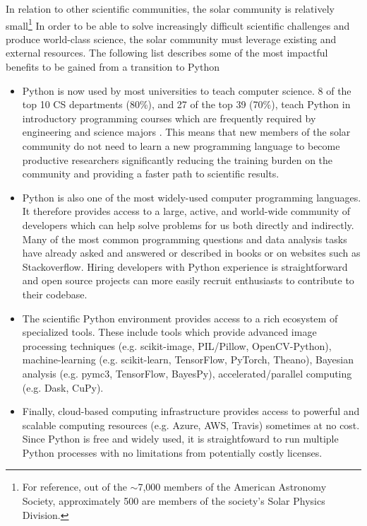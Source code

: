 In relation to other scientific communities, the solar community is relatively small\footnote{For reference, out of the $\sim$7,000 members of the American Astronomy Society, approximately 500 are members of the society's Solar Physics Division.}
In order to be able to solve increasingly difficult scientific challenges and produce world-class science, the solar community must leverage existing and external resources.
The following list describes some of the most impactful benefits to be gained from a transition to Python

\begin{itemize}
  \item Python is now used by most universities to teach computer science. 8 of the top 10 CS departments (80\%), and 27 of the top 39 (70\%), teach Python in introductory programming courses which are frequently required by engineering and science majors \citep{guo2014}. This means that new members of the solar community do not need to learn a new programming language to become productive researchers significantly reducing the training burden on the community and providing a faster path to scientific results.
  \item Python is also one of the most widely-used computer programming languages. It therefore provides access to a large, active, and world-wide community of developers which can help solve problems for us both directly and indirectly. Many of the most common programming questions and data analysis tasks have already asked and answered or described in books or on websites such as Stackoverflow. Hiring developers with Python experience is straightforward and open source projects can more easily recruit enthusiasts to contribute to their codebase.
  \item The scientific Python environment provides access to a rich ecosystem of specialized tools. These include tools which provide advanced image processing techniques (e.g. scikit-image, PIL/Pillow, OpenCV-Python), machine-learning (e.g. scikit-learn, TensorFlow, PyTorch, Theano), Bayesian analysis (e.g. pymc3, TensorFlow, BayesPy), accelerated/parallel computing (e.g. Dask, CuPy).
  \item Finally, cloud-based computing infrastructure provides access to powerful and scalable computing resources (e.g. Azure, AWS, Travis) sometimes at no cost. Since Python is free and widely used, it is straightfoward to run multiple Python processes with no limitations from potentially costly licenses.
\end{itemize}

